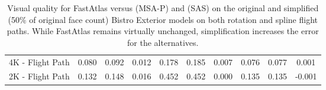 \begin{table}
\begin{tabular}{l|ccc|ccc|ccc}
4K - Flight Path           & 0.080        & 0.092     & 0.012     & 0.178          & 0.185     & 0.007     & 0.076         & 0.077     & 0.001                \\
2K - Flight Path           & 0.132        & 0.148     & 0.016     & 0.452          & 0.452     & 0.000     & 0.135         & 0.135     & -0.001              
\end{tabular}
\vspace{1mm}
\caption{Visual quality for FastAtlas versus \cite{Neff2022MSA} (MSA-P) and \cite{mueller2018shading} (SAS) on the original and simplified (50\% of original face count) Bistro Exterior models on both rotation and spline flight paths. While FastAtlas \FLIP remains virtually unchanged, simplification increases the error for the alternatives.}
\label{tab:bistro_ext_simplified}
\end{table}
